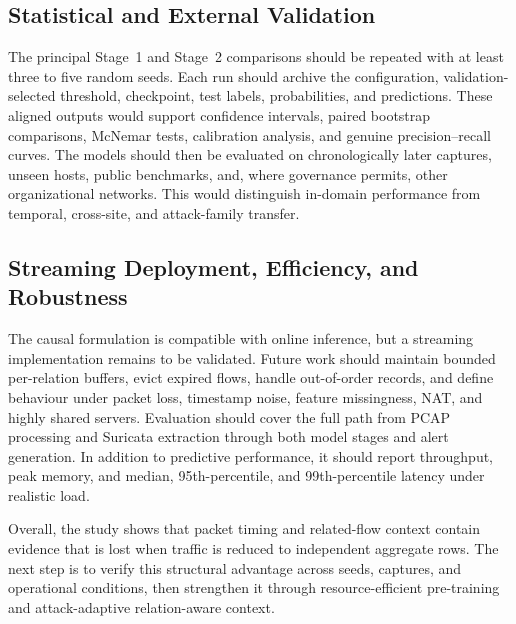 \documentclass[11pt,fleqn]{report}
\begin{document}
\subsection{Statistical and External Validation}
\label{subsubsec:future_validation}

The principal Stage~1 and Stage~2 comparisons should be repeated with at least
three to five random seeds. Each run should archive the configuration,
validation-selected threshold, checkpoint, test labels, probabilities, and
predictions. These aligned outputs would support confidence intervals, paired
bootstrap comparisons, McNemar tests, calibration analysis, and genuine
precision--recall curves. The models should then be evaluated on
chronologically later captures, unseen hosts, public benchmarks, and, where
governance permits, other organizational networks. This would distinguish
in-domain performance from temporal, cross-site, and attack-family transfer.

\subsection{Streaming Deployment, Efficiency, and Robustness}
\label{subsubsec:future_streaming_deployment}

The causal formulation is compatible with online inference, but a streaming
implementation remains to be validated. Future work should maintain bounded
per-relation buffers, evict expired flows, handle out-of-order records, and
define behaviour under packet loss, timestamp noise, feature missingness, NAT,
and highly shared servers. Evaluation should cover the full path from PCAP
processing and Suricata extraction through both model stages and alert
generation. In addition to predictive performance, it should report throughput,
peak memory, and median, 95th-percentile, and 99th-percentile latency under
realistic load.

Overall, the study shows that packet timing and related-flow context contain
evidence that is lost when traffic is reduced to independent aggregate rows.
The next step is to verify this structural advantage across seeds, captures,
and operational conditions, then strengthen it through resource-efficient
pre-training and attack-adaptive relation-aware context.




\end{document}
